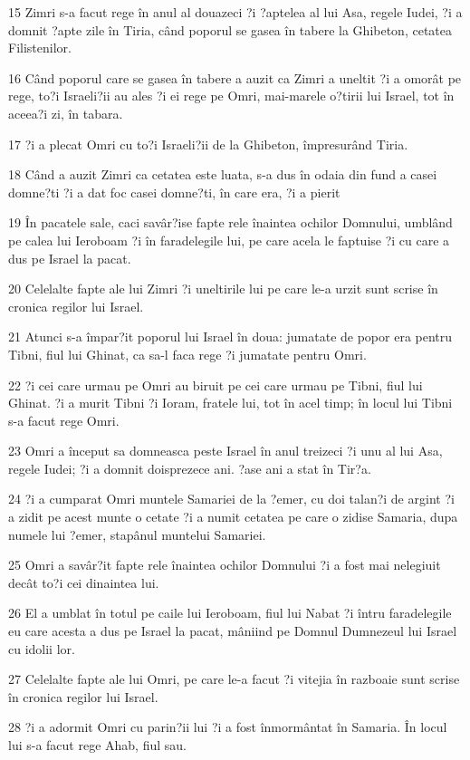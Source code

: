 \par 15 Zimri s-a facut rege în anul al douazeci ?i ?aptelea al lui Asa, regele Iudei, ?i a domnit ?apte zile în Tiria, când poporul se gasea în tabere la Ghibeton, cetatea Filistenilor.
\par 16 Când poporul care se gasea în tabere a auzit ca Zimri a uneltit ?i a omorât pe rege, to?i Israeli?ii au ales ?i ei rege pe Omri, mai-marele o?tirii lui Israel, tot în aceea?i zi, în tabara.
\par 17 ?i a plecat Omri cu to?i Israeli?ii de la Ghibeton, împresurând Tiria.
\par 18 Când a auzit Zimri ca cetatea este luata, s-a dus în odaia din fund a casei domne?ti ?i a dat foc casei domne?ti, în care era, ?i a pierit
\par 19 În pacatele sale, caci savâr?ise fapte rele înaintea ochilor Domnului, umblând pe calea lui Ieroboam ?i în faradelegile lui, pe care acela le faptuise ?i cu care a dus pe Israel la pacat.
\par 20 Celelalte fapte ale lui Zimri ?i uneltirile lui pe care le-a urzit sunt scrise în cronica regilor lui Israel.
\par 21 Atunci s-a împar?it poporul lui Israel în doua: jumatate de popor era pentru Tibni, fiul lui Ghinat, ca sa-l faca rege ?i jumatate pentru Omri.
\par 22 ?i cei care urmau pe Omri au biruit pe cei care urmau pe Tibni, fiul lui Ghinat. ?i a murit Tibni ?i Ioram, fratele lui, tot în acel timp; în locul lui Tibni s-a facut rege Omri.
\par 23 Omri a început sa domneasca peste Israel în anul treizeci ?i unu al lui Asa, regele Iudei; ?i a domnit doisprezece ani. ?ase ani a stat în Tir?a.
\par 24 ?i a cumparat Omri muntele Samariei de la ?emer, cu doi talan?i de argint ?i a zidit pe acest munte o cetate ?i a numit cetatea pe care o zidise Samaria, dupa numele lui ?emer, stapânul muntelui Samariei.
\par 25 Omri a savâr?it fapte rele înaintea ochilor Domnului ?i a fost mai nelegiuit decât to?i cei dinaintea lui.
\par 26 El a umblat în totul pe caile lui Ieroboam, fiul lui Nabat ?i întru faradelegile eu care acesta a dus pe Israel la pacat, mâniind pe Domnul Dumnezeul lui Israel cu idolii lor.
\par 27 Celelalte fapte ale lui Omri, pe care le-a facut ?i vitejia în razboaie sunt scrise în cronica regilor lui Israel.
\par 28 ?i a adormit Omri cu parin?ii lui ?i a fost înmormântat în Samaria. În locul lui s-a facut rege Ahab, fiul sau.
